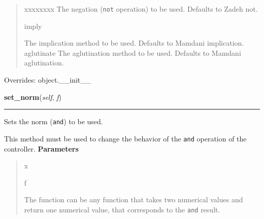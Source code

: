 \begin{boxedminipage}{\funcwidth}
\begin{quote}
\begin{Ventry}{xxxxxxxx}
The negation (\texttt{not} operation) to be used. Defaults to Zadeh not.
          \item[imply]


The implication method to be used. Defaults to Mamdani implication.          aglutinate
The aglutination method to be used. Defaults to Mamdani
aglutination.
        \end{Ventry}

      \end{quote}

      Overrides: object.\_\_init\_\_

    \end{boxedminipage}

    \label{peach:fuzzy:control:Controller:set_norm}

    \vspace{0.5ex}

\hspace{.8\funcindent}\begin{boxedminipage}{\funcwidth}

    \raggedright \textbf{set\_norm}(\textit{self}, \textit{f})

    \vspace{-1.5ex}

    \rule{\textwidth}{0.5\fboxrule}
\setlength{\parskip}{2ex}

Sets the norm (\texttt{and}) to be used.

This method must be used to change the behavior of the \texttt{and} operation
of the controller.
\setlength{\parskip}{1ex}
      \textbf{Parameters}
      \vspace{-1ex}

      \begin{quote}
        \begin{Ventry}{x}

          \item[f]


The function can be any function that takes two numerical values and
return one numerical value, that corresponds to the \texttt{and} result.
        \end{Ventry}

      \end{quote}

    \end{boxedminipage}

